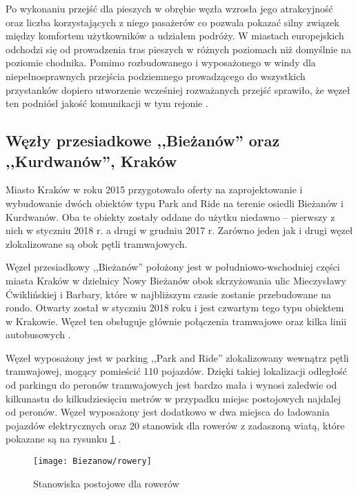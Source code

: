 \documentclass[twoside,12pt]{article}
\begin{document}
	Po wykonaniu przejść dla pieszych w obrębie węzła wzrosła jego atrakcyjność oraz liczba korzystających z niego pasażerów co pozwala pokazać silny związek między komfortem użytkowników a udziałem podróży. W miastach europejskich odchodzi się od prowadzenia tras pieszych w różnych poziomach niż domyślnie na poziomie chodnika. Pomimo rozbudowanego i wyposażonego w windy dla niepełnosprawnych przejścia podziemnego prowadzącego do wszystkich przystanków dopiero utworzenie wcześniej rozważanych przejść sprawiło, że węzeł ten podniósł jakość komunikacji w tym rejonie \cite{grunwaldzki3}. 
	
	\subsection{Węzły przesiadkowe ,,Bieżanów'' oraz ,,Kurdwanów'', Kraków}
	
	Miasto Kraków w roku 2015 przygotowało oferty na zaprojektowanie i wybudowanie dwóch obiektów typu Park and Ride na terenie osiedli Bieżanów i Kurdwanów. Oba te obiekty zostały oddane do użytku niedawno -- pierwszy z nich w styczniu 2018 r. a drugi w grudniu 2017 r. Zarówno jeden jak i drugi węzeł zlokalizowane są obok pętli tramwajowych.
	
	Węzeł przesiadkowy ,,Bieżanów'' położony jest w południowo-wschodniej części miasta Kraków w dzielnicy Nowy Bieżanów obok skrzyżowania ulic Mieczysławy Ćwiklińskiej i Barbary, które w najbliższym czasie zostanie przebudowane na rondo. Otwarty został w styczniu 2018 roku i  jest czwartym tego typu obiektem w Krakowie. Węzeł ten obsługuje głównie połączenia tramwajowe oraz kilka linii autobusowych \cite{biezanow1}. 
	
	Węzeł wyposażony jest w parking ,,Park and Ride'' zlokalizowany wewnątrz pętli tramwajowej, mogący pomieścić 110 pojazdów. Dzięki takiej lokalizacji odległość od parkingu do peronów tramwajowych jest bardzo mała i wynosi zaledwie od kilkunastu do kilkudziesięciu metrów w przypadku miejsc postojowych najdalej od peronów. Węzeł wyposażony jest dodatkowo w dwa miejsca do ładowania pojazdów elektrycznych oraz 20 stanowisk dla rowerów z zadaszoną wiatą, które pokazane są na rysunku \ref{biezanow3} \cite{biezanow2}.
	
		\begin{figure}[H]
		\centering
		\texttt{[image: Biezanow/rowery]}\\
		\caption{Stanowiska postojowe dla rowerów}
		\label{biezanow3}
	\end{figure}	
	
\end{document}
